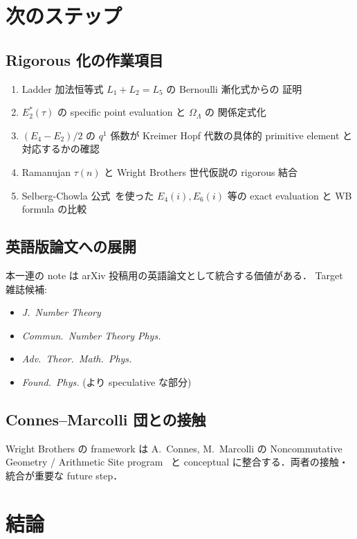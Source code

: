 \documentclass[11pt,a4paper]{article}
\begin{document}
\section{次のステップ}

\subsection{Rigorous 化の作業項目}

\begin{enumerate}
\item Ladder 加法恒等式 $L_1 + L_2 = L_5$ の Bernoulli 漸化式からの
証明
\item $E_2^*(\tau)$ の specific point evaluation と $\Omega_\Lambda$ の
関係定式化
\item $(E_4 - E_2)/2$ の $q^1$ 係数が Kreimer Hopf 代数の具体的
primitive element と対応するかの確認
\item Ramanujan $\tau(n)$ と Wright Brothers 世代仮説の rigorous 結合
\item Selberg-Chowla 公式~\cite{Chowla1967}を使った
$E_4(i), E_6(i)$ 等の exact evaluation と WB formula の比較
\end{enumerate}

\subsection{英語版論文への展開}

本一連の note は arXiv 投稿用の英語論文として統合する価値がある．
Target 雑誌候補:
\begin{itemize}
\item \textit{J.\ Number Theory}
\item \textit{Commun.\ Number Theory Phys.}
\item \textit{Adv.\ Theor.\ Math.\ Phys.}
\item \textit{Found.\ Phys.} (より speculative な部分)
\end{itemize}

\subsection{Connes--Marcolli 団との接触}

Wright Brothers の framework は A.~Connes, M.~Marcolli の
Noncommutative Geometry / Arithmetic Site program~\cite{CM2008, CC2014}
と conceptual に整合する．両者の接触・統合が重要な future step．

\section{結論}
\end{document}
